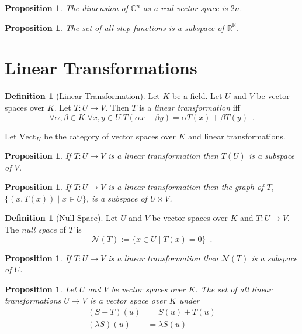 \documentclass{book}
\newtheorem{prop}[ax]{Proposition}
\theoremstyle{definition}
\newtheorem{df}[ax]{Definition}
\begin{document}
\begin{prop}
The dimension of $\mathbb{C}^n$ as a real vector space is $2n$.
\end{prop}

\begin{prop}
The set of all step functions is a subspace of $\mathbb{R}^\mathbb{R}$.
\end{prop}

\section{Linear Transformations}

\begin{df}[Linear Transformation]
Let $K$ be a field.
Let $U$ and $V$ be vector spaces over $K$. Let $T : U \rightarrow V$. Then $T$ is a \emph{linear transformation} iff
\[ \forall \alpha, \beta \in K. \forall x,y \in U. T(\alpha x + \beta y) = \alpha T(x) + \beta T(y) \enspace . \]

Let $\mathrm{Vect}_K$ be the category of vector spaces over $K$ and linear transformations.
\end{df}

\begin{prop}
If $T : U \rightarrow V$ is a linear transformation then $T(U)$ is a subspace of $V$.
\end{prop}

\begin{prop}
If $T : U \rightarrow V$ is a linear transformation then the graph of $T$, $\{ (x, T(x)) \mid x \in U \}$, is a subspace of $U \times V$.
\end{prop}

\begin{df}[Null Space]
Let $U$ and $V$ be vector spaces over $K$ and $T : U \rightarrow V$. The \emph{null space} of $T$ is
\[ \mathcal{N}(T) := \{ x \in U \mid T(x) = 0 \} \enspace . \]
\end{df}

\begin{prop}
If $T : U \rightarrow V$ is a linear transformation then $\mathcal{N}(T)$ is a subspace of $U$.
\end{prop}

\begin{prop}
Let $U$ and $V$ be vector spaces over $K$. The set of all linear transformations $U \rightarrow V$ is a vector space over $K$ under
\begin{align*}
(S + T)(u) & = S(u) + T(u) \\
(\lambda S)(u) & = \lambda S(u)
\end{align*}
\end{prop}
\end{document}
